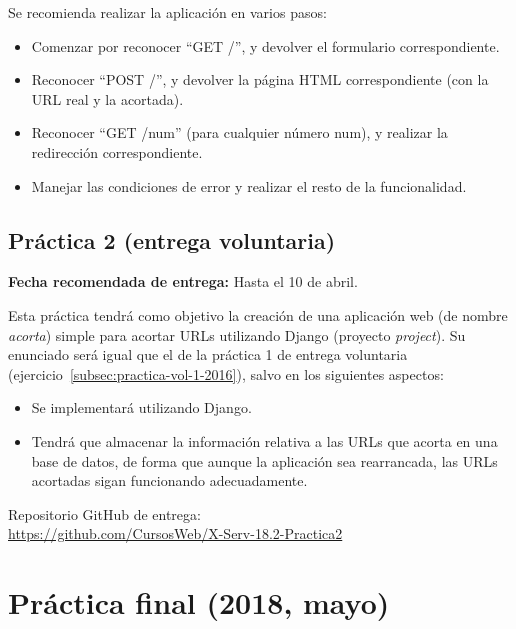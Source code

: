 Se recomienda realizar la aplicación en varios pasos:

\begin{itemize}
\item Comenzar por reconocer ``GET /'', y devolver el formulario correspondiente.
\item Reconocer ``POST /'', y devolver la página HTML correspondiente (con la URL real y la acortada).
\item Reconocer ``GET /num'' (para cualquier número num), y realizar la redirección correspondiente.
\item Manejar las condiciones de error y realizar el resto de la funcionalidad.
\end{itemize}

\subsection{Práctica 2 (entrega voluntaria)}
\label{subsec:practica-vol-2-2015}

\textbf{Fecha recomendada de entrega:} Hasta el 10 de abril.

Esta práctica tendrá como objetivo la creación de una aplicación web (de nombre \emph{acorta}) simple para acortar URLs utilizando Django (proyecto \emph{project}). Su enunciado será igual que el de la práctica 1 de entrega voluntaria (ejercicio~\ref{subsec:practica-vol-1-2016}), salvo en los siguientes aspectos:

\begin{itemize}
  \item Se implementará utilizando Django.
  \item Tendrá que almacenar la información relativa a las URLs que acorta en una base de datos, de forma que aunque la aplicación sea rearrancada, las URLs acortadas sigan funcionando adecuadamente.
\end{itemize}

Repositorio GitHub de entrega: \\
\url{https://github.com/CursosWeb/X-Serv-18.2-Practica2}

\newpage

\section{Práctica final (2018, mayo)}
\label{practica-final-2018-05}

